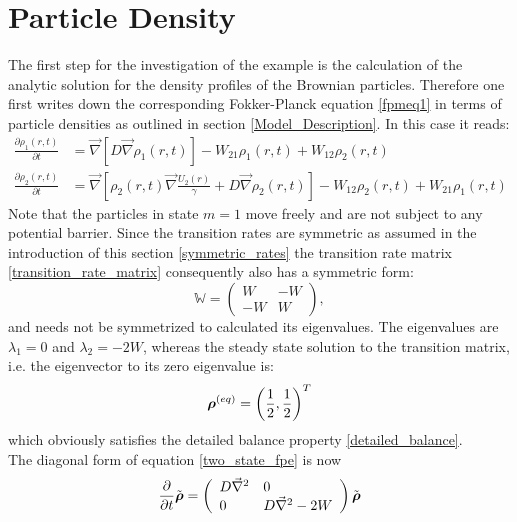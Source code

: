 \section{Particle Density}
The first step for the investigation of the example is the calculation of the analytic solution for the density profiles of the Brownian particles. Therefore one first writes down the corresponding Fokker-Planck equation \eqref{fpmeq1} in terms of particle densities as outlined in section  \ref{Model_Description}. In this case it reads:
\begin{align}
    \frac{\partial \rho_1(r,t)}{\partial t} &= \vec \nabla \left[ D \vec \nabla \rho_1(r,t) \right] - W_{21}\rho_1(r,t) + W_{12}\rho_2(r,t) \nonumber \\
    \frac{\partial \rho_2(r,t)}{\partial t} &= \vec \nabla \left[\rho_2(r,t) \vec \nabla \frac{U_2(r)}{\gamma} + D \vec \nabla \rho_2(r,t) \right] - W_{12}\rho_2(r,t) + W_{21}\rho_1(r,t)
    \label{two_state_fpe}
\end{align}
Note that the particles in state $m=1$ move freely and are not subject to any potential barrier. 
Since the transition rates are symmetric as assumed in the introduction of this section \eqref{symmetric_rates} the transition rate matrix \eqref{transition_rate_matrix} consequently also has a symmetric form:
\begin{equation}
    \mathbb{W} = \left( \begin{array}{rr}
    W & -W \\
    -W & W 
\end{array} \right),
    \label{two_state_transition_matrix}
\end{equation}
and needs not be symmetrized to calculated its eigenvalues.
The eigenvalues are $\lambda_1 = 0$ and $\lambda_2 = -2W$, whereas the steady state solution to the transition matrix, i.e. the eigenvector to its zero eigenvalue is: 
\begin{equation}
    \boldsymbol{\mathbf{\rho}}^{(eq)}=\left(\frac{1}{2}, \frac{1}{2}\right)^{T}
    \label{rhoeq}
\end{equation}
which obviously satisfies the detailed balance property \eqref{detailed_balance}. \\
The diagonal form of equation \eqref{two_state_fpe} is now 
\begin{equation}
    \frac{\partial}{\partial t} \tilde{\boldsymbol{\mathbf{\rho}}} = \left( \begin{array}{ll}
        D\vec{\nabla}^{2} & 0 \\
        0 & D\vec{\nabla}^{2} - 2W
    \end{array} \right) \tilde{\boldsymbol{\mathbf{\rho}}}
    \label{fpmeq5}
\end{equation}

